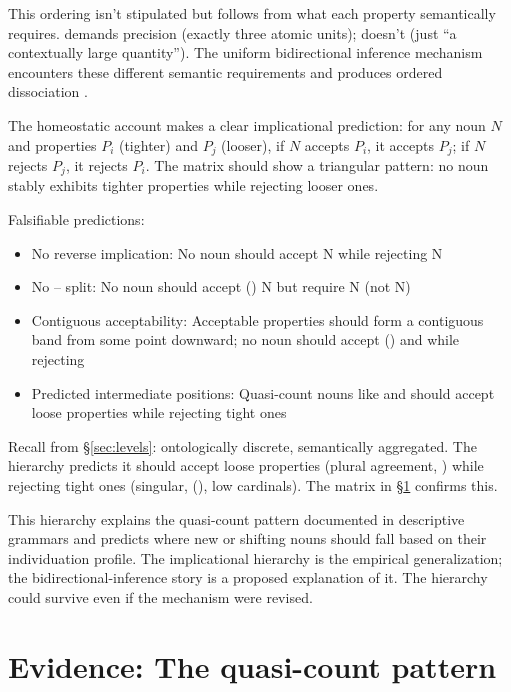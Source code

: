 \documentclass[12pt,a4paper]{article}
\begin{document}
This ordering isn't stipulated but follows from what each property semantically requires.  demands precision (exactly three atomic units);  doesn't (just \enquote{a contextually large quantity}). The uniform bidirectional inference mechanism encounters these different semantic requirements and produces ordered dissociation \citep{allan1980,grimm2018}.

The homeostatic account makes a clear implicational prediction: for any noun $N$ and properties $P_i$ (tighter) and $P_j$ (looser), if $N$ accepts $P_i$, it accepts $P_j$; if $N$ rejects $P_j$, it rejects $P_i$. The matrix should show a triangular pattern: no noun stably exhibits tighter properties while rejecting looser ones.

Falsifiable predictions:
\begin{itemize}
\item No reverse implication: No noun should accept  N while rejecting  N
\item No -- split: No noun should accept () N but require  N (not  N)
\item Contiguous acceptability: Acceptable properties should form a contiguous band from some point downward; no noun should accept () and  while rejecting 
\item Predicted intermediate positions: Quasi-count nouns like  and  should accept loose properties while rejecting tight ones
\end{itemize}

Recall  from \S\ref{sec:levels}: ontologically discrete, semantically aggregated. The hierarchy predicts it should accept loose properties (plural agreement, ) while rejecting tight ones (singular, (), low cardinals). The matrix in \S\ref{sec:evidence} confirms this.

This hierarchy explains the quasi-count pattern documented in descriptive grammars and predicts where new or shifting nouns should fall based on their individuation profile. The implicational hierarchy is the empirical generalization; the bidirectional-inference story is a proposed explanation of it. The hierarchy could survive even if the mechanism were revised.

\section{Evidence: The quasi-count pattern}\label{sec:evidence}
\end{document}
